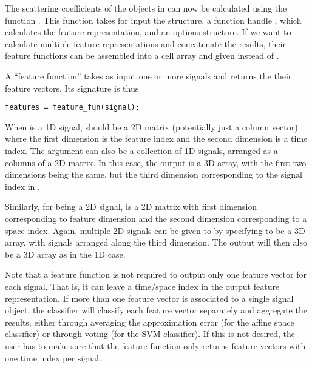 \documentclass[twocolumn]{article}
\begin{document}
The scattering coefficients of the objects in  can now be calculated using the function . This function takes for input the  structure, a function handle , which calculates the feature representation, and an options structure. If we want to calculate multiple feature representations and concatenate the results, their feature functions can be assembled into a cell array and given instead of .

A ``feature function'' takes as input one or more signals and returns the their feature vectors. Its signature is thus
\begin{lstlisting}
features = feature_fun(signal);
\end{lstlisting}

When  is a 1D signal,  should be a 2D matrix (potentially just a column vector) where the first dimension is the feature index and the second dimension is a time index. The  argument can also be a collection of 1D signals, arranged as a columns of a 2D matrix. In this case, the output  is a 3D array, with the first two dimensions being the same, but the third dimension corresponding to the signal index in .

Similarly, for  being a 2D signal,  is a 2D matrix with first dimension corresponding to feature dimension and the second dimension corresponding to a space index. Again, multiple 2D signals can be given to  by specifying  to be a 3D array, with signals arranged along the third dimension. The output  will then also be a 3D array as in the 1D case.

Note that a feature function is not required to output only one feature vector for each signal. That is, it can leave a time/space index in the output feature representation. If more than one feature vector is associated to a single signal object, the classifier will classify each feature vector separately and aggregate the results, either through averaging the approximation error (for the affine space classifier) or through voting (for the SVM classifier). If this is not desired, the user has to make sure that the feature function only returns feature vectors with one time index per signal.
\end{document}
